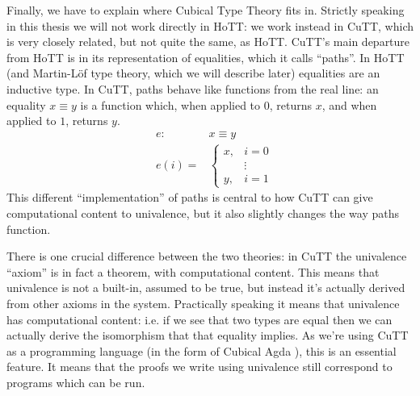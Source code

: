Finally, we have to explain where Cubical Type Theory
\citep{cohenCubicalTypeTheory2016} fits in.
Strictly speaking in this thesis we will not work directly in HoTT: we work
instead in CuTT, which is very closely related, but not quite the same, as HoTT.
CuTT's main departure from HoTT is in its representation of equalities, which it
calls ``paths''.
In HoTT (and Martin-Löf type theory, which we will describe later) equalities
are an inductive type.
In CuTT, paths behave like functions from the real line: an equality
\(x \equiv y\) is a function which, when applied to \(0\), returns \(x\), and
when applied to \(1\), returns \(y\).
\begin{equation}
\begin{aligned}
  & e  :    & x \equiv y \\
  & e(i) = & \begin{cases}
    x, & i = 0 \\
       & \vdots \\
    y, & i = 1
  \end{cases}
\end{aligned}
\end{equation}
This different ``implementation'' of paths is central to how CuTT can give
computational content to univalence, but it also slightly changes the way paths
function.

There is one crucial difference between the two theories: in CuTT the
univalence ``axiom'' is in fact a theorem, with computational content.
This means that univalence is not a built-in, assumed to be true, but instead
it's actually derived from other axioms in the system.
Practically speaking it means that univalence has computational content: i.e. if
we see that two types are equal then we can actually derive the isomorphism that
that equality implies.
As we're using CuTT as a programming language (in the form of Cubical Agda
\citep{vezzosiCubicalAgdaDependently2019}), this is an essential feature.
It means that the proofs we write using univalence still correspond to programs
which can be run.


